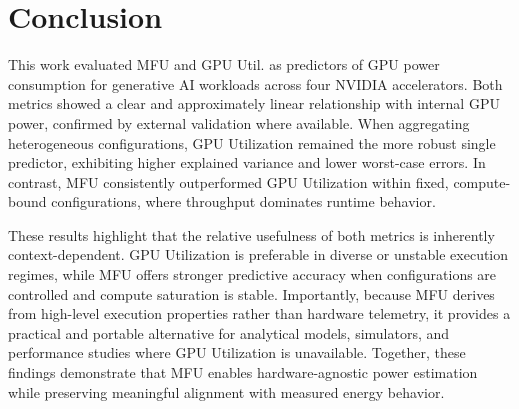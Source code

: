 \documentclass[runningheads]{llncs}
\begin{document}

\section{Conclusion}\label{Conclusion}
This work evaluated MFU and GPU Util. as predictors of GPU power consumption for generative AI workloads across four NVIDIA accelerators. Both metrics showed a clear and approximately linear relationship with internal GPU power, confirmed by external validation where available. When aggregating heterogeneous configurations, GPU Utilization remained the more robust single predictor, exhibiting higher explained variance and lower worst-case errors. In contrast, MFU consistently outperformed GPU Utilization within fixed, compute-bound configurations, where throughput dominates runtime behavior.

These results highlight that the relative usefulness of both metrics is inherently context-dependent. GPU Utilization is preferable in diverse or unstable execution regimes, while MFU offers stronger predictive accuracy when configurations are controlled and compute saturation is stable. Importantly, because MFU derives from high-level execution properties rather than hardware telemetry, it provides a practical and portable alternative for analytical models, simulators, and performance studies where GPU Utilization is unavailable. Together, these findings demonstrate that MFU enables hardware-agnostic power estimation while preserving meaningful alignment with measured energy behavior.




\end{document}
